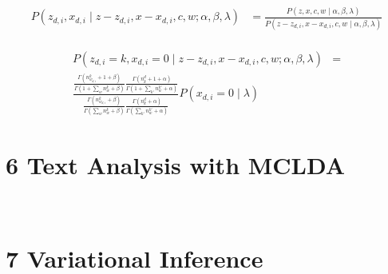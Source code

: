 \documentclass[12pt]{article}
\begin{document}
\begin{align}
P (z_{d,i}, x_{d,i} \mid z-z_{d,i},x-x_{d,i},c,w;\alpha, \beta, \lambda) &= \frac{P (z, x, c, w\mid \alpha, \beta, \lambda)}{P (z-z_{d,i}, x-x_{d,i}, c, w\mid \alpha, \beta, \lambda)} \nonumber\\
\end{align}

\begin{align}
P (z_{d,i}=k, x_{d,i} = 0 \mid z-z_{d,i},x-x_{d,i},c,w;\alpha, \beta, \lambda) &= \nonumber\\
\frac{\frac{\Gamma(n^{k}_{w_{d,i}} +1+\beta)}{\Gamma(1+\sum_{w} n^{k}_{w}+\beta)}  \frac{\Gamma(n^{d}_{k} +1+\alpha)}{\Gamma(1+\sum_{k'} n^{k'}_{w}+\alpha)}}{\frac{\Gamma(n^{k}_{w_{d,i}} +\beta)}{\Gamma(\sum_{w} n^{k}_{w}+\beta)}  \frac{\Gamma(n^{d}_{k} +\alpha)}{\Gamma(\sum_{k'} n^{k'}_{w}+\alpha)}} P(x_{d,i} = 0 \mid \lambda)
\end{align}

\section*{6 Text Analysis with MCLDA}
\\

\section*{7 Variational Inference}
\\



\end{document}
